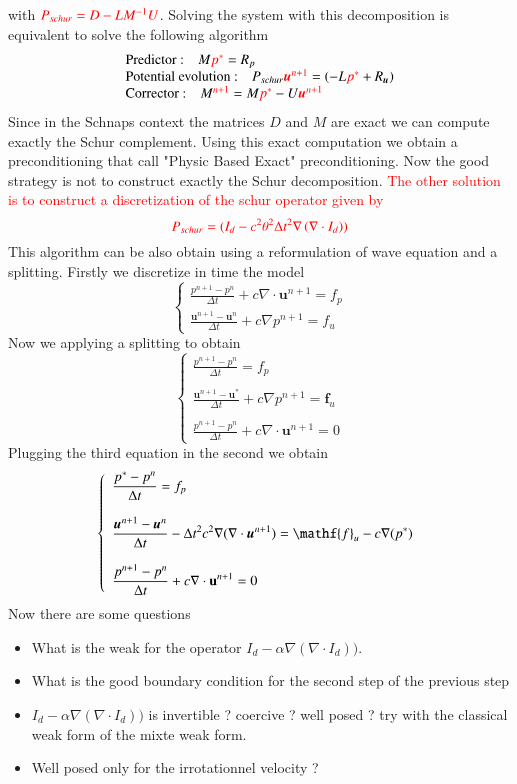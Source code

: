 \documentclass[a4paper,twoside,french,english,11pt]{article}
\newcommand{\ds}{\displaystyle}
\begin{document}
with $\textcolor{red}{P_{schur}=D-LM^{-1}U}$. Solving the system with this decomposition is equivalent to solve the following algorithm 
$$
\left.\begin{array}{l}
\mbox{Predictor :\quad} M \textcolor{red}{p^*}=R_{p}\\
\mbox{Potential evolution :\quad} P_{schur}\textcolor{red}{\bm{u}^{n+1}}=\left(-L\textcolor{red}{p^*}+R_{\bm{u}}\right)\\
\mbox{Corrector :\quad}  M\textcolor{red}{^{n+1}}=M\textcolor{red}{p^*}-U\textcolor{red}{\bm{u}^{n+1}}\end{array}\right.
$$
Since in the Schnaps context the matrices $D$ and $M$ are exact we can compute exactly the Schur complement. Using this exact computation we obtain a preconditioning that call "Physic Based Exact" preconditioning.
Now the good strategy is not to construct exactly the Schur decomposition. \textcolor{red}{The other solution is to construct a discretization of the schur operator given by}
$$
\displaystyle \textcolor{red}{P_{schur}=(I_d-c^2\theta^2 \Delta t^2 \nabla \left( \nabla \cdot I_d \right))}
$$
This algorithm can be also obtain using a reformulation of wave equation and a splitting. Firstly we discretize in time the model
$$
\left\{\begin{array}{l}
\ds \frac{p^{n+1}-p^n}{\Delta t}+ c \nabla \cdot \bm{u}^{n+1}= f_p \\
\ds \frac{\bm{u}^{n+1}-\bm{u}^n}{\Delta t} +c\nabla p^{n+1} = f_u \end{array}\right.
$$
Now we applying a splitting to obtain
$$
\left\{\begin{array}{l}
\ds \frac{p^{n+1}-p^n}{\Delta t} = f_p\\
~\\
\ds \frac{\bm{u}^{n+1}-\bm{u}^*}{\Delta t} +c\nabla p^{n+1} = \mathbf{f}_u\\
~\\
 \ds \frac{p^{n+1}-p^n}{\Delta t}+ c\nabla \cdot  \mathbf{u}^{n+1}=0\end{array}\right.
$$
Plugging the third equation in the second we obtain
$$
\left\{\begin{array}{l}
\ds \frac{p^{*}-p^n}{\Delta t}  = f_p\\
~\\
\ds \frac{\bm{u}^{n+1}-\bm{u}^n}{\Delta t}- \Delta t^2 c^2 \nabla (\nabla \cdot \bm{u}^{n+1}) = \mathf{f}_u-c\nabla (p^*) \\
~\\
\ds \frac{p^{n+1}-p^n}{\Delta t}+ c\nabla \cdot  \mathbf{u}^{n+1}= 0 \end{array}\right.
$$
Now there are some questions
\begin{itemize}
\item What is the weak for the operator $I_d-\alpha \nabla \left( \nabla \cdot I_d \right))$.
\item What is the good boundary condition for the second step of the previous step
\item $I_d-\alpha \nabla \left( \nabla \cdot I_d \right))$ is invertible ? coercive ? well posed ? try with the classical weak form of the mixte weak form.
\item Well posed only for the irrotationnel velocity ?
\end{itemize}
\end{document}
